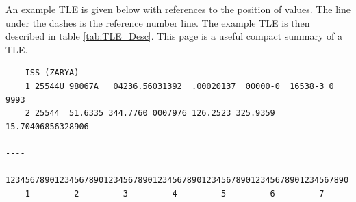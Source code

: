 \documentclass[12pt]{article}
\begin{document}
	\singlespacing
	An example TLE is given below with references to the position of values. The line under the dashes is the reference number line. The example TLE is then described in table  \ref{tab:TLE_Desc}. This page is a useful compact summary of a TLE.
	\begin{verbatim}
	ISS (ZARYA)
	1 25544U 98067A   04236.56031392  .00020137  00000-0  16538-3 0  9993
	2 25544  51.6335 344.7760 0007976 126.2523 325.9359 15.70406856328906
	----------------------------------------------------------------------
	1234567890123456789012345678901234567890123456789012345678901234567890   
	1         2         3         4         5         6         7
	
	\end{verbatim}%
	
\end{document}

